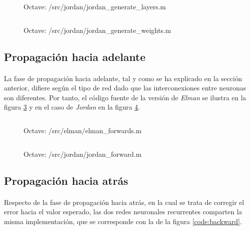 \documentclass[10pt, a4paper,spanish]{article}
\begin{document}
			\begin{figure}[htpb!]
				\centering
				\inputminted{octave}{../src/jordan/jordan_generate_layers.m}
				\caption{Octave: /src/jordan/jordan\_generate\_layers.m}
				\label{code:jordan_generate_layers}
			\end{figure}

			\begin{figure}[htpb!]
				\centering
				\inputminted{octave}{../src/jordan/jordan_generate_weights.m}
				\caption{Octave: /src/jordan/jordan\_generate\_weights.m}
				\label{code:jordan_generate_weights}
			\end{figure}


		\subsection{Propagación hacia adelante}
			\paragraph{}
			La fase de propagación hacia adelante, tal y como se ha explicado en la sección anterior, difiere según el tipo de red dado que las interconexiones entre neuronas son diferentes. Por tanto, el código fuente de la versión de \emph{Elman} se ilustra en la figura \ref{code:elman_forward} y en el caso de \emph{Jordan} en la figura \ref{code:jordan_forward}.

			\begin{figure}[htpb!]
				\centering
				\inputminted{octave}{../src/elman/elman_forward.m}
				\caption{Octave: /src/elman/elman\_forwards.m}
				\label{code:elman_forward}
			\end{figure}

			\begin{figure}[htpb!]
				\centering
				\inputminted{octave}{../src/jordan/jordan_forward.m}
				\caption{Octave: /src/jordan/jordan\_forward.m}
				\label{code:jordan_forward}
			\end{figure}

		\subsection{Propagación hacia atrás}
			\paragraph{}
			Respecto de la fase de propagación hacia atrás, en la cual se trata de corregir el error hacia el valor esperado, las dos redes neuronales recurrentes comparten la misma implementación, que se corresponde con la de la figura \ref{code:backward}.
\end{document}

